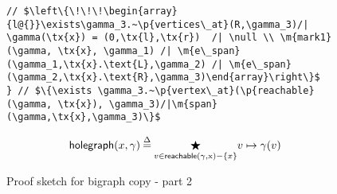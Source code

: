 \begin{figure}
\begin{lstlisting}
// $\left\{\!\!\!\begin{array}{l@{}}\exists\gamma_3.~\p{vertices\_at}(R,\gamma_3)/| \gamma(\tx{x}) = (0,\tx{l},\tx{r})  /| \null \\ \m{mark1}(\gamma, \tx{x}, \gamma_1) /| \m{e\_span}(\gamma_1,\tx{x}.\text{L},\gamma_2) /| \m{e\_span}(\gamma_2,\tx{x}.\text{R},\gamma_3)\end{array}\right\}$
} // $\{\exists \gamma_3.~\p{vertex\_at}(\p{reachable}(\gamma, \tx{x}), \gamma_3)/|\m{span}(\gamma,\tx{x},\gamma_3)\}$
  \end{lstlisting}
  \small
\begin{gather*}
  \mathsf{holegraph}(x, \gamma)\mathbin{\stackrel{\Delta}{=}} \underset{v\in\mathsf{reachable}(\gamma, \text{x}) - \{x\}}{\bigstar}v \mapsto \gamma(v)\\
\end{gather*}
\caption{Proof sketch for bigraph copy - part 2}
\label{fig:copy-part2}
\end{figure}
